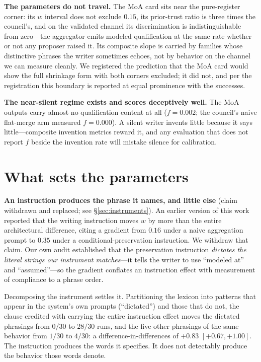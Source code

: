 \documentclass[11pt]{article}
\newcommand{\ww}{\ensuremath{w}}
\begin{document}
\textbf{The parameters do not travel.} The MoA card sits near the
pure-register corner: its \ww{} interval does not exclude $0.15$, its
prior-trust ratio is three times the council's, and on the validated channel
its discrimination is indistinguishable from zero---the aggregator emits
modeled qualification at the same rate whether or not any proposer raised
it. Its composite slope is carried by families whose distinctive phrases
the writer sometimes echoes, not by behavior on the channel we can measure
cleanly. We registered the prediction that the MoA card would show the full
shrinkage form with both corners excluded; it did not, and per the
registration this boundary is reported at equal prominence with the
successes.

\textbf{The near-silent regime exists and scores deceptively well.} The MoA
outputs carry almost no qualification content at all ($f=0.002$; the
council's naive flat-merge arm measured $f=0.000$). A silent writer invents
little because it says little---composite invention metrics reward it, and
any evaluation that does not report $f$ beside the invention rate will
mistake silence for calibration.

\section{What sets the parameters}
\label{sec:sets}

\textbf{An instruction produces the phrase it names, and little else}
(claim withdrawn and replaced; see \S\ref{sec:instruments}). An earlier
version of this work reported that the writing instruction moves \ww{} by
more than the entire architectural difference, citing a gradient from
$0.16$ under a naive aggregation prompt to $0.35$ under a
conditional-preservation instruction. We withdraw that claim. Our own
audit established that the preservation instruction \emph{dictates the
literal strings our instrument matches}---it tells the writer to use
``modeled at'' and ``assumed''---so the gradient conflates an instruction
effect with measurement of compliance to a phrase order.

Decomposing the instrument settles it. Partitioning the lexicon into
patterns that appear in the system's own prompts (``dictated'') and those
that do not, the clause credited with carrying the entire instruction
effect moves the dictated phrasings from $0/30$ to $28/30$ runs, and the
five other phrasings of the same behavior from $1/30$ to $4/30$: a
difference-in-differences of $+0.83$ $[+0.67, +1.00]$. The instruction
produces the words it specifies. It does not detectably produce the
behavior those words denote.
\end{document}
